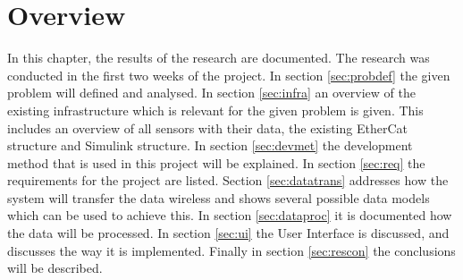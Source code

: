 \section{Overview}
In this chapter, the results of the research are documented. The research was conducted in the first two weeks of the project. In section \ref{sec:probdef} the given problem will defined and analysed. In section \ref{sec:infra} an overview of the existing infrastructure which is relevant for the given problem is given. This includes an overview of all sensors with their data, the existing EtherCat structure and Simulink structure. In section \ref{sec:devmet} the development method that is used in this project will be explained. In section \ref{sec:req} the requirements for the project are listed. Section \ref{sec:datatrans} addresses how the system will transfer the data wireless and shows several possible data models which can be used to achieve this. In section \ref{sec:dataproc} it is documented how the data will be processed. In section \ref{sec:ui} the User Interface is discussed, and discusses the way it is implemented. Finally in section \ref{sec:rescon} the conclusions will be described.
